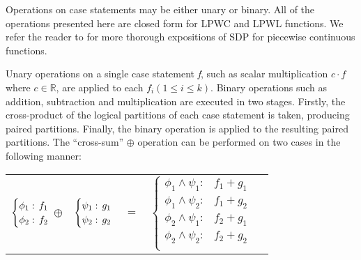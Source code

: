 Operations on case statements may be either unary or binary. All of the operations presented here are closed form for LPWC and LPWL functions. We refer the reader to \parencite{Sanner_UAI_2011,Zamani_AAAI_2012} for more thorough expositions of SDP for piecewise continuous functions.

Unary operations on a single case statement \emph{f}, such as scalar multiplication {\footnotesize$c \cdot f$} where {\footnotesize$ c \in \mathbb{R} $}, are applied to  each {\footnotesize$f_i \left(1 \leq i \leq k\right)$}. Binary operations such as addition, subtraction and multiplication are executed in two stages. Firstly, the cross-product of the logical partitions of each case statement is taken, producing paired partitions. Finally, the binary operation is applied to the resulting paired partitions. The ``cross-sum'' {\footnotesize$\oplus$} operation can be performed on two cases in the following manner:
{\footnotesize 
    \begin{center}
        \begin{tabular}{r c c c l}
            $\begin{cases}
            \phi_1: \hspace{-1mm} & \hspace{-1mm} f_1  \\ 
            \phi_2: \hspace{-1mm} & \hspace{-1mm} f_2  \\ 
            \end{cases}$
            $\oplus$
            &
            \hspace{-4mm}
            $\begin{cases}
            \psi_1: \hspace{-1mm} & \hspace{-1mm} g_1  \\ 
            \psi_2: \hspace{-1mm} & \hspace{-1mm} g_2  \\ 
            \end{cases}$
            &
            \hspace{-4mm} 
            $ = $
            &
            \hspace{-4mm}
            $\begin{cases}
            \phi_1 \wedge \psi_1: & f_1 + g_1 \\
            \phi_1 \wedge \psi_2: & f_1 + g_2 \\
            \phi_2 \wedge \psi_1: & f_2 + g_1 \\
            \phi_2 \wedge \psi_2: & f_2 + g_2  \\
            \end{cases}$
        \end{tabular}
    \end{center}
}%

